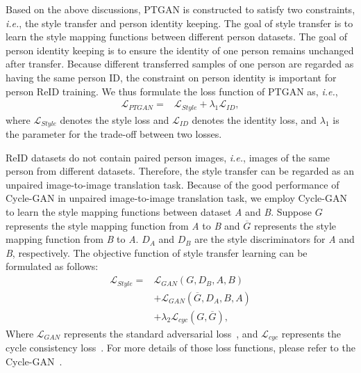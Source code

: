 \documentclass[10pt,twocolumn,letterpaper]{article}
\begin{document}
Based on the above discussions, PTGAN is constructed to satisfy two constraints, \emph{i.e.}, the style transfer and person identity keeping. The goal of style transfer is to learn the style mapping functions between different person datasets. The goal of person identity keeping is to ensure the identity of one person remains unchanged after transfer. Because different transferred samples of one person are regarded as having the same person ID, the constraint on person identity is important for person ReID training. We thus formulate the loss function of PTGAN as, \emph{i.e.},
\begin{equation}
\begin{split}
\mathcal{L}_{PTGAN} = &\mathcal{L}_{Style} + \lambda_{1}\mathcal{L}_{ID},
\end{split}
\end{equation}
where $\mathcal{L}_{Style}$ denotes the style loss and $\mathcal{L}_{ID}$ denotes the identity loss, and $\lambda_{1}$ is the parameter for the trade-off between two losses.

ReID datasets do not contain paired person images, \emph{i.e.}, images of the same person from different datasets. Therefore, the style transfer can be regarded as an unpaired image-to-image translation task. Because of the good performance of Cycle-GAN in unpaired image-to-image translation task, we employ Cycle-GAN to learn the style mapping functions between dataset \emph{A} and \emph{B}. Suppose $G$ represents the style mapping function from \emph{A} to \emph{B} and $\overline{G}$ represents the style mapping function from \emph{B} to \emph{A}. $D_A$ and $D_B$ are the style discriminators for \emph{A} and \emph{B}, respectively. The objective function of style transfer learning can be formulated as follows:
\begin{equation}
\begin{split}
\mathcal{L}_{Style} =  &\mathcal{L}_{GAN}(G,D_B,A,B) \\
&+ \mathcal{L}_{GAN}(\overline{G},D_A,B,A) \\
&+ \lambda_{2} \mathcal{L}_{cyc}(G,\overline{G}),
\end{split}
\end{equation}
Where $\mathcal{L}_{GAN}$ represents the standard adversarial loss~\cite{goodfellow2014generative}, and $\mathcal{L}_{cyc}$ represents the cycle consistency loss~\cite{zhu2017unpaired}. For more details of those loss functions, please refer to the Cycle-GAN~\cite{zhu2017unpaired}.
\end{document}
